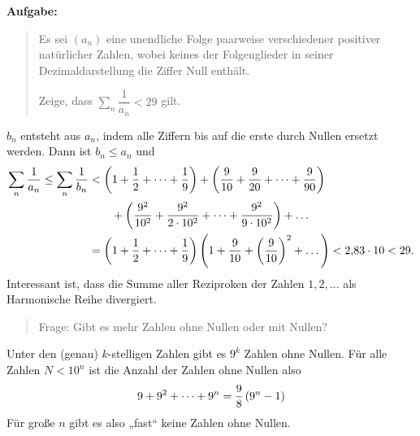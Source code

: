 \documentclass[11pt,a4paper]{article}
\begin{document}
\textbf{Aufgabe:} 
\begin{quote}
  Es sei $(a_n)$ eine unendliche Folge paarweise verschiedener positiver
  natürlicher Zahlen, wobei keines der Folgenglieder in seiner
  Dezimaldarstellung die Ziffer Null enthält.

  Zeige, dass $\sum_n{\dfrac{1}{a_n}}<29$ gilt. 
\end{quote}
\begin{loesung}
  $b_n$ entsteht aus $a_n$, indem alle Ziffern bis auf die erste durch Nullen
  ersetzt werden.  Dann ist $b_n\le a_n$ und
  \begin{align*}
    \sum_n{\frac{1}{a_n}}\le\sum_n{\frac{1}{b_n}}&<\left(1+\frac12+\dots+\frac19\right)
    +\left(\frac{9}{10}+\frac{9}{20}+\dots+\frac{9}{90}\right)\\&\qquad
    +\left(\frac{9^2}{10^2}+\frac{9^2}{2\cdot 10^2}+\dots+\frac{9^2}{9\cdot 10^2}\right)+
    \dots\\ &=
    \left(1+\frac12+\dots+\frac19\right)\left(1+\frac{9}{10}+\left(\frac{9}{10}\right)^2+\dots\right)
    <2{,}83\cdot 10 <29.
  \end{align*}
  Interessant ist, dass die Summe aller Reziproken der Zahlen $1,2,\dots$ als
  Harmonische Reihe divergiert.
\end{loesung}
\begin{quote}
  Frage: Gibt es mehr Zahlen ohne Nullen oder mit Nullen?
\end{quote}
Unter den (genau) $k$-stelligen Zahlen gibt es $9^k$ Zahlen ohne Nullen.  Für
alle Zahlen $N<10^n$ ist die Anzahl der Zahlen ohne Nullen also
\begin{gather*}
  9+9^2+\dots+9^n=\frac98\left(9^n-1\right)
\end{gather*}
Für große $n$ gibt es also „fast“ keine Zahlen ohne Nullen. 
\end{document}
